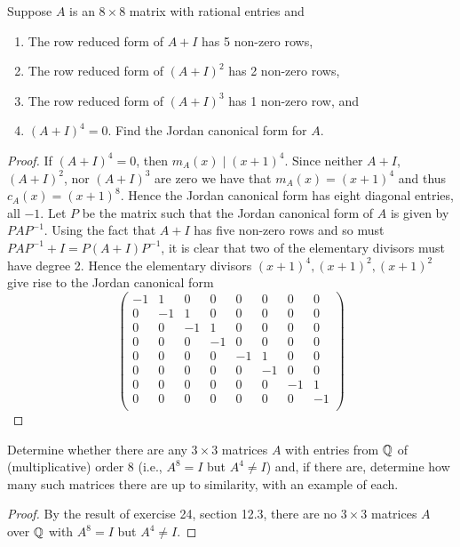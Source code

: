 \documentclass[10pt]{amsart}
\begin{document}
\begin{thm}
  \label{Ex3}
  Suppose $A$ is an $8 \times 8$ matrix with rational entries and 
  \begin{enumerate}
    \renewcommand{\theenumi}{\roman{enumi}.}
    \renewcommand{\labelenumi}{\theenumi}
  \item
    The row reduced form of $A + I$ has 5 non-zero rows,
  \item
    The row reduced form of $(A+I)^2$ has 2 non-zero rows,
  \item
    The row reduced form of $(A+I)^3$ has 1 non-zero row, and
  \item
    $(A+I)^4 = 0$.
    Find the Jordan canonical form for $A$.
  \end{enumerate}
  \begin{proof}
    If $(A+I)^4 = 0$, then $m_A(x) \mid (x+1)^4$.
    Since neither $A+I$, $(A+I)^2$, nor $(A+I)^3$ are zero we have that $m_A(x) = (x+1)^4$ and thus $c_A(x) = (x+1)^8$.
    Hence the Jordan canonical form has eight diagonal entries, all $-1$.
    Let $P$ be the matrix such that the Jordan canonical form of $A$ is given by $PAP^{-1}$.
    Using the fact that $A+I$ has five non-zero rows and so must $PAP^{-1} +I = P(A+I)P^{-1}$, it is clear that two of the elementary divisors must have degree 2.
    Hence the elementary divisors $(x+1)^4, (x+1)^2, (x+1)^2$ give rise to the Jordan canonical form
    \[\begin{pmatrix}
      -1 & 1 & 0 & 0 & 0 & 0 & 0 & 0\\
      0 & - 1 & 1 & 0 & 0 & 0 & 0 & 0\\
      0 & 0 & -1 & 1 & 0 & 0 & 0 & 0\\
      0 & 0 & 0 & -1 & 0 & 0 & 0 & 0\\
      0 & 0 & 0 & 0  & -1 & 1 & 0 & 0\\
      0 & 0 & 0 & 0  & 0 & -1 & 0 & 0\\
      0 & 0 & 0 & 0  & 0 & 0 & -1 & 1\\
      0 & 0 & 0 & 0  & 0 & 0 & 0 & -1\\
    \end{pmatrix}\]

  \end{proof}
\end{thm}

\begin{thm}
  \label{Ex4}
  Determine whether there are any $3\times3$ matrices $A$ with entries from $\mathbb{Q}$ of (multiplicative) order 8 (i.e., $A^8 = I$ but $A^4 \neq I$) and, if there are, determine how many such matrices there are up to similarity, with an example of each.
  \begin{proof}
    By the result of exercise 24, section 12.3, there are no $3\times3$ matrices $A$ over $\mathbb{Q}$ with $A^8 = I$ but $A^4 \neq I$.
  \end{proof}
\end{thm}
\end{document}

